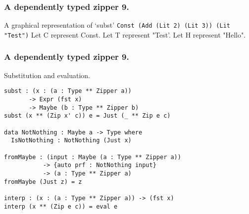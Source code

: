 \documentclass{beamer}
\begin{document}
\begin{frame}[fragile]
  \frametitle{A dependently typed zipper 9.}
  \begin{block}{A graphical representation of `subst'}
  \texttt{Const (Add (Lit 2) (Lit 3)) (Lit "Test")}
  Let C represent Const.
  Let T represent "Test'. Let H represent "Hello".
  \end{block}
\end{frame}

\begin{frame}[fragile]
  \frametitle{A dependently typed zipper 9.}
  \begin{block}{Substitution and evaluation.}
  \begin{verbatim}
subst : (x : (a : Type ** Zipper a)) 
       -> Expr (fst x) 
       -> Maybe (b : Type ** Zipper b)
subst (x ** (Zip x' c)) e = Just (_ ** Zip e c)

data NotNothing : Maybe a -> Type where
  IsNotNothing : NotNothing (Just x)

fromMaybe : (input : Maybe (a : Type ** Zipper a))
           -> {auto prf : NotNothing input}
           -> (a : Type ** Zipper a)
fromMaybe (Just z) = z

interp : (x : (a : Type ** Zipper a)) -> (fst x)
interp (x ** (Zip e c)) = eval e
  \end{verbatim}
  \end{block}
\end{frame}
\end{document}
